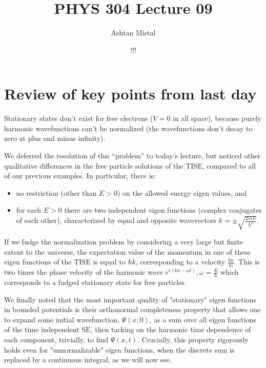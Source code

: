 \documentclass{article}
\title{PHYS 304 Lecture 09}
\author{Ashtan Mistal}
\date{!!!}
\begin{document}
\ifstandalone
\maketitle
\fi

\graphicspath{{./Lecture09/}}

\section{Review of key points from last day}

Stationary states don’t exist for free electrons ($V=0$ in all space), because purely harmonic wavefunctions can’t be normalized (the wavefunctions don’t decay to zero at plus and minus infinity).

We deferred the resolution of this “problem” to today’s lecture, but noticed other qualitative differences in the free particle solutions of the TISE, compared to all of our previous examples.  In particular, there is:

\begin{itemize}
    \item no restriction (other than $E>0$) on the allowed energy eigen values, and 
    \item for each $E>0$ there are two independent eigen functions (complex conjugates of each other), characterized by equal and opposite wavevectors $k = \pm \sqrt{\frac{2mE}{\hbar^2}}$.
\end{itemize}

If we fudge the normalization problem by considering a very large but finite extent to the universe, the expectation value of the momentum in one of these eigen functions of the TISE is equal to $\hbar k$, corresponding to a velocity $\frac{\hbar k}{m}$. This is two times the phase velocity of the harmonic wave $e^{i(k x-\omega t)}, \omega=\frac{E}{h}$ which corresponds to a fudged stationary state for free particles.

We finally noted that the most important quality of "stationary" eigen functions in bounded potentials is their orthonormal completeness property that allows one to expand some initial wavefunction, $\Psi(x, 0)$, as a sum over all eigen functions of the time independent $\mathrm{SE}$, then tacking on the harmonic time dependence of each component, trivially, to find $\Psi(x, t)$. Crucially, this property rigorously holds even for "unnormalizable" eigen functions, when the discrete sum is replaced by a continuous integral, as we will now see.
\end{document}

